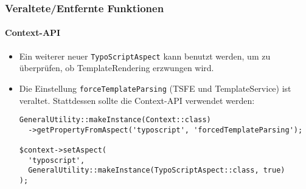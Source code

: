 
\begin{frame}[fragile]
	\frametitle{Veraltete/Entfernte Funktionen}
	\framesubtitle{Context-API}

	\lstset{basicstyle=\tiny\ttfamily}

	\begin{itemize}

		\item Ein weiterer neuer \texttt{TypoScriptAspect} kann benutzt werden, um zu überprüfen,
			ob TemplateRendering erzwungen wird.

		\item Die Einstellung \texttt{forceTemplateParsing} (TSFE und TemplateService) ist veraltet.
			Stattdessen sollte die Context-API verwendet werden:

\begin{lstlisting}
GeneralUtility::makeInstance(Context::class)
  ->getPropertyFromAspect('typoscript', 'forcedTemplateParsing');

$context->setAspect(
  'typoscript',
  GeneralUtility::makeInstance(TypoScriptAspect::class, true)
);
\end{lstlisting}

	\end{itemize}

\end{frame}


